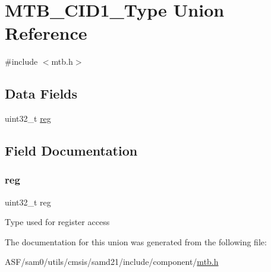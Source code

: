 \hypertarget{union_m_t_b___c_i_d1___type}{}\section{M\+T\+B\+\_\+\+C\+I\+D1\+\_\+\+Type Union Reference}
\label{union_m_t_b___c_i_d1___type}


{\ttfamily \#include $<$mtb.\+h$>$}

\subsection*{Data Fields}
\begin{DoxyCompactItemize}
\item 
uint32\+\_\+t \mbox{\hyperlink{union_m_t_b___c_i_d1___type_a6b91636401516a477989a336376d7b40}{reg}}
\end{DoxyCompactItemize}


\subsection{Field Documentation}
\mbox{\label{union_m_t_b___c_i_d1___type_a6b91636401516a477989a336376d7b40}} 
\subsubsection{\texorpdfstring{reg}{reg}}
{\footnotesize\ttfamily uint32\+\_\+t reg}

Type used for register access 

The documentation for this union was generated from the following file\+:\begin{DoxyCompactItemize}
\item 
A\+S\+F/sam0/utils/cmsis/samd21/include/component/\mbox{\hyperlink{component_2mtb_8h}{mtb.\+h}}\end{DoxyCompactItemize}

